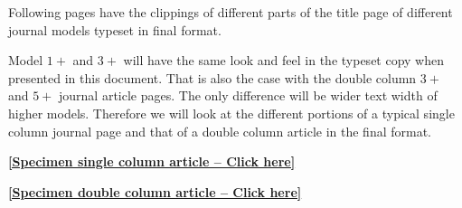 \documentclass[a4paper,12pt]{article}
\begin{document}
	Following pages have the clippings of different parts of
	the title page of different journal models typeset in final
	format.
	
	Model $1+$ and $3+$  will have the same look and
	feel in the typeset copy when presented in this document. That is
	also the case with the double column $3+$ and $5+$ journal article
	pages. The only difference will be wider text width of
	higher models.  Therefore we will look at the
	different portions of a typical single column journal page and
	that of a double column article in the final format.
	
	\vspace*{2pc}
	
	\begin{center}
	\hypertarget{bsc}{}
	\hyperlink{sc}{
	{\bf [Specimen single column article -- Click here]}
	}
	
	\vspace*{2pc}
	
	\hypertarget{bsc}{}
	\hyperlink{dc}{
	{\bf [Specimen double column article -- Click here]}
	}
	\end{center}
	
	\newpage
	\vspace*{-2pc}
	\src{}\hypertarget{sc}{}
	\def\rulecolor{blue!70}
	\hyperlink{bsc}{}
	\def\rulecolor{orange}
	
	
	\newpage
	
	\src{}\hypertarget{dc}{}
	\def\rulecolor{blue!70}
	\hyperlink{bsc}{}
	\def\rulecolor{orange}
	
	
\end{document}
